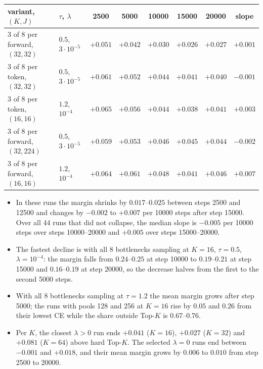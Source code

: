 \documentclass[11pt,a4paper]{article}
\begin{document}
\begin{center}
\small
\begin{tabular}{llcccccc}
\toprule
variant, $(K,J)$ & $\tau$, $\lambda$ & 2500 & 5000 & 10000 & 15000 & 20000 & slope \\
\midrule
3 of 8 per forward, $(32,32)$  & $0.5$, $3\cdot10^{-5}$ & $+0.051$ & $+0.042$ & $+0.030$ & $+0.026$ & $+0.027$ & $+0.001$ \\
3 of 8 per token, $(32,32)$    & $0.5$, $3\cdot10^{-5}$ & $+0.061$ & $+0.052$ & $+0.044$ & $+0.041$ & $+0.040$ & $-0.001$ \\
3 of 8 per token, $(16,16)$    & $1.2$, $10^{-4}$       & $+0.065$ & $+0.056$ & $+0.044$ & $+0.038$ & $+0.041$ & $+0.003$ \\
3 of 8 per forward, $(32,224)$ & $0.5$, $3\cdot10^{-5}$ & $+0.059$ & $+0.053$ & $+0.046$ & $+0.045$ & $+0.044$ & $-0.002$ \\
3 of 8 per forward, $(16,16)$  & $1.2$, $10^{-4}$       & $+0.064$ & $+0.061$ & $+0.048$ & $+0.041$ & $+0.046$ & $+0.007$ \\
\bottomrule
\end{tabular}
\end{center}

\begin{itemize}[leftmargin=1.2em,itemsep=2pt]
\item In these runs the margin shrinks by $0.017$--$0.025$ between steps 2500 and
  12500 and changes by $-0.002$ to $+0.007$ per 10000 steps after step 15000.
  Over all 44 runs that did not collapse, the median slope is $-0.005$ per 10000
  steps over steps 10000--20000 and $+0.005$ over steps 15000--20000.
\item The fastest decline is with all 8 bottlenecks sampling at $K = 16$,
  $\tau = 0.5$, $\lambda = 10^{-4}$: the margin falls from $0.24$--$0.25$ at step
  10000 to $0.19$--$0.21$ at step 15000 and $0.16$--$0.19$ at step 20000, so the
  decrease halves from the first to the second 5000 steps.
\item With all 8 bottlenecks sampling at $\tau = 1.2$ the mean margin grows after
  step 5000; the runs with pools 128 and 256 at $K = 16$ rise by $0.05$ and $0.26$
  from their lowest CE while the share outside Top-$K$ is $0.67$--$0.76$.
\item Per $K$, the closest $\lambda > 0$ run ends $+0.041$ ($K = 16$), $+0.027$
  ($K = 32$) and $+0.081$ ($K = 64$) above hard Top-$K$. The selected
  $\lambda = 0$ runs end between $-0.001$ and $+0.018$, and their mean margin grows
  by $0.006$ to $0.010$ from step 2500 to 20000.
\end{itemize}
\end{document}
